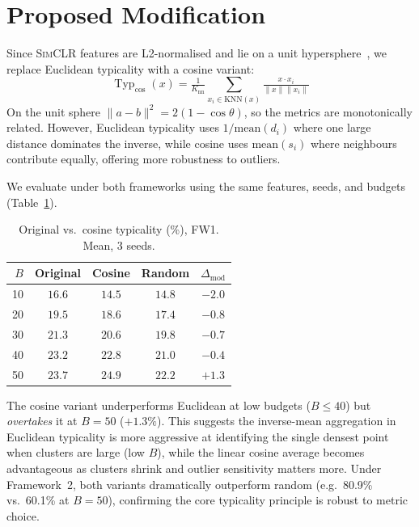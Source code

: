 \documentclass[10pt, conference, twocolumn]{IEEEtran}
\newcommand{\simclr}{\textsc{SimCLR}}
\begin{document}
\section{Proposed Modification}
\label{sec:modification}

Since \simclr{} features are L2-normalised and lie on a unit
hypersphere~\cite{wang2020understanding}, we replace Euclidean
typicality with a cosine variant:
%
\begin{equation}
  \operatorname{Typ}_{\cos}(x)
  = \tfrac{1}{K_{\mathrm{nn}}}
    {\textstyle\sum_{x_i \in \mathrm{KNN}(x)}}
    \tfrac{x \cdot x_i}{\|x\|\|x_i\|}
  \label{eq:cosine-typ}
\end{equation}
%
On the unit sphere $\|a{-}b\|^2 = 2(1{-}\cos\theta)$, so the metrics
are monotonically related.  However, Euclidean typicality uses
$1/\text{mean}(d_i)$ where one large distance dominates the inverse,
while cosine uses $\text{mean}(s_i)$ where neighbours contribute
equally, offering more robustness to outliers.

We evaluate under both frameworks using the same features, seeds, and
budgets (Table~\ref{tab:mod}).

\begin{table}[t]
\centering
\caption{Original vs.\ cosine typicality (\%), FW1. Mean, 3 seeds.}
\label{tab:mod}
\scriptsize
\setlength{\tabcolsep}{3pt}
\begin{tabular}{@{}rcccc@{}}
\toprule
$B$ & Original & Cosine & Random & $\Delta_\text{mod}$ \\
\midrule
10 & $\mathbf{16.6}$ & $14.5$ & $14.8$ & $-2.0$ \\
20 & $\mathbf{19.5}$ & $18.6$ & $17.4$ & $-0.8$ \\
30 & $\mathbf{21.3}$ & $20.6$ & $19.8$ & $-0.7$ \\
40 & $\mathbf{23.2}$ & $22.8$ & $21.0$ & $-0.4$ \\
50 & $23.7$ & $\mathbf{24.9}$ & $22.2$ & $+1.3$ \\
\bottomrule
\end{tabular}
\end{table}

The cosine variant underperforms Euclidean at low budgets ($B{\leq}40$)
but \emph{overtakes} it at $B{=}50$ ($+1.3\%$).  This suggests the
inverse-mean aggregation in Euclidean typicality is more aggressive at
identifying the single densest point when clusters are large (low $B$),
while the linear cosine average becomes advantageous as clusters shrink
and outlier sensitivity matters more.  Under Framework~2, both variants
dramatically outperform random (e.g.\ 80.9\% vs.\ 60.1\% at $B{=}50$),
confirming the core typicality principle is robust to metric choice.
\end{document}
